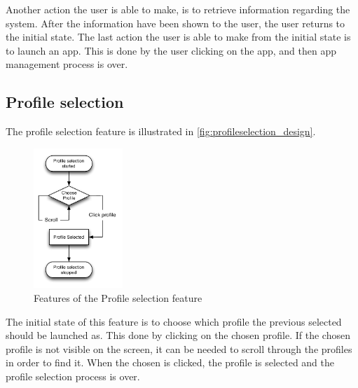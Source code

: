 Another action the user is able to make, is to retrieve information regarding the system.
After the information have been shown to the user, the user returns to the initial state.
The last action the user is able to make from the initial state is to launch an app.
This is done by the user clicking on the app, and then app management process is over.

\subsection{Profile selection}
The profile selection feature is illustrated in \autoref{fig:profileselection_design}. 
\label{design:profile_selection}
\begin{figure}[h]
	\centering
	\includegraphics[width=0.3\textwidth]{gfx/profileselect_design.pdf}
	\caption{Features of the Profile selection feature}
	\label{fig:profileselection_design}
\end{figure}
The initial state of this feature is to choose which profile the previous selected should be launched as. This done by clicking on the chosen profile. If the chosen profile is not visible on the screen, it can be needed to scroll through the profiles in order to find it. When the chosen is clicked, the profile is selected and the profile selection process is over.